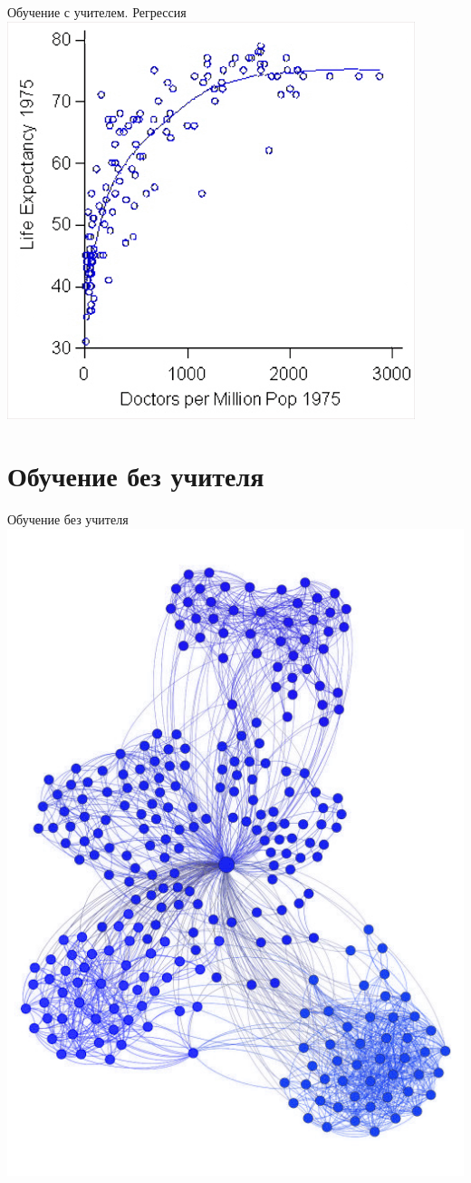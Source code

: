 \documentclass[10pt]{beamer}
\begin{document}
{
\begin{frame}{Обучение с учителем. Регрессия}
  \centering
  \includegraphics[width=0.7 \linewidth, height=0.7 \textheight, keepaspectratio]{images/regression}\\
\end{frame}
}

\section{Обучение без учителя}

{
\begin{frame}{Обучение без учителя}
  \centering
  \includegraphics[width=0.9 \linewidth, height=0.9 \textheight, keepaspectratio]{images/clustering1}\\
\end{frame}
}
\end{document}
